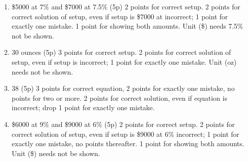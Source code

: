 \documentclass{ximera}
\begin{document}
\begin{enumerate}
  \item \$5000 at 7\% and \$7000 at 7.5\%
  (5p) 2 points for correct setup. 2 points for correct solution of setup, even if setup is \$7000 at incorrect; 1 point for exactly one mistake. 1 point for showing both amounts. Unit (\$) needs 7.5\% not be shown.
  \item 30 ounces (5p) 3 points for correct setup. 2 points for correct solution of setup, even if setup is incorrect; 1 point for exactly one mistake. Unit (oz) needs not be shown.
  \item 38 (5p) 3 points for correct equation, 2 points for exactly one mistake, no points for two or more. 2 points for correct solution, even if equation is incorrect; drop 1 point for exactly one mistake.
  \item \$6000 at 9\%  and  \$9000  at 6\%      
  (5p) 2 points for correct setup. 2 points for correct solution of setup, even if setup is \$9000 at 6\% incorrect; 1 point for exactly one mistake, no points thereafter. 1 point for showing both amounts. Unit (\$) needs not be shown.
\end{enumerate}
\end{document}
